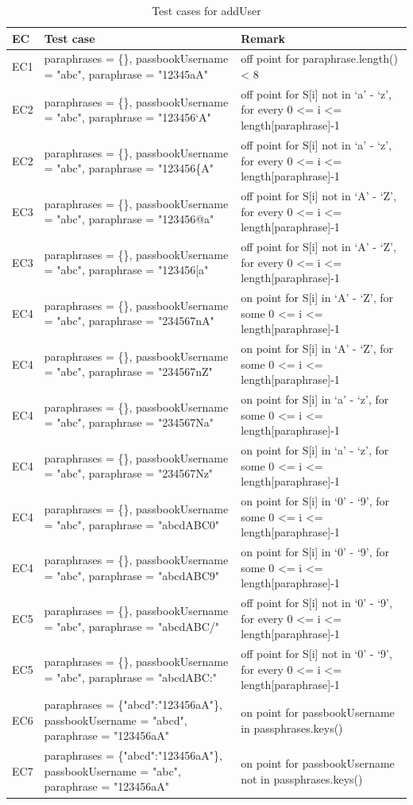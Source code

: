 \documentclass{article}
\begin{document}
\begin{longtable}{|p{2cm}|p{7cm}|p{5cm}|}
\caption{Test cases for addUser}\\
\hline 
EC&Test case&Remark\\
\hline  
EC1&paraphrases = \{\}, passbookUsername = "abc", paraphrase = "12345aA"&off point for paraphrase.length() < 8\\
\hline
EC2&paraphrases = \{\}, passbookUsername = "abc", paraphrase = "123456`A"&off point for S[i] not in ‘a’ - ‘z’, for every 0 <= i <= length[paraphrase]-1\\
\hline
EC2&paraphrases = \{\}, passbookUsername = "abc", paraphrase = "123456\{A"&off point for S[i] not  in ‘a’ - ‘z’, for every 0 <= i <= length[paraphrase]-1\\
\hline
EC3&paraphrases = \{\}, passbookUsername = "abc", paraphrase = "123456@a"&off point for S[i] not in ‘A’ - ‘Z’, for every 0 <= i <= length[paraphrase]-1\\
\hline
EC3&paraphrases = \{\}, passbookUsername = "abc", paraphrase = "123456[a"&off point for S[i] not  in ‘A’ - ‘Z’, for every 0 <= i <= length[paraphrase]-1\\
\hline
EC4&paraphrases = \{\}, passbookUsername = "abc", paraphrase = "234567nA"&on point for S[i] in ‘A’ - ‘Z’, for some 0 <= i <= length[paraphrase]-1\\
\hline
EC4&paraphrases = \{\}, passbookUsername = "abc", paraphrase = "234567nZ"&on point for S[i] in ‘A’ - ‘Z’, for some 0 <= i <= length[paraphrase]-1\\
\hline
EC4&paraphrases = \{\}, passbookUsername = "abc", paraphrase = "234567Na"&on point for S[i] in ‘a’ - ‘z’, for some 0 <= i <= length[paraphrase]-1\\
\hline
EC4&paraphrases = \{\}, passbookUsername = "abc", paraphrase = "234567Nz"&on point for S[i] in ‘a’ - ‘z’, for some 0 <= i <= length[paraphrase]-1\\
\hline
EC4&paraphrases = \{\}, passbookUsername = "abc", paraphrase = "abcdABC0"&on point for S[i] in ‘0’ - ‘9’, for some 0 <= i <= length[paraphrase]-1\\
\hline
EC4&paraphrases = \{\}, passbookUsername = "abc", paraphrase = "abcdABC9"&on point for S[i] in ‘0’ - ‘9’, for some 0 <= i <= length[paraphrase]-1\\
\hline
EC5&paraphrases = \{\}, passbookUsername = "abc", paraphrase = "abcdABC/"&off point for S[i] not in ‘0’ - ‘9’, for every 0 <= i <= length[paraphrase]-1\\
\hline
EC5&paraphrases = \{\}, passbookUsername = "abc", paraphrase = "abcdABC:"&off point for S[i] not in ‘0’ - ‘9’, for every 0 <= i <= length[paraphrase]-1\\
\hline
EC6&paraphrases = \{"abcd":"123456aA"\}, passbookUsername = "abcd", paraphrase = "123456aA"&on point for passbookUsername in passphrases.keys()\\
\hline
EC7&paraphrases = \{"abcd":"123456aA"\}, passbookUsername = "abc", paraphrase = "123456aA"&on point for passbookUsername not in passphrases.keys()\\
\hline
\end{longtable}
\end{document}
